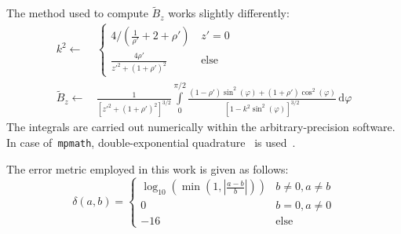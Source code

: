 The method used to compute $\tilde{B}_z$ works slightly differently:
\begin{align}
 k^2 \leftarrow&\,
  \begin{cases}
    4 / \left( \frac{1}{\rho'} + 2 + \rho' \right) &\, z' = 0 \\
    \frac{4 \rho'}{{z'}^2 + \left(1 + \rho'\right)^2} &\, \textrm{else}
  \end{cases} \nonumber \\
 \tilde{B}_z \leftarrow&\,
   \frac{1}{\left[ {z'}^2 + \left(1 + \rho'\right)^2 \right]^{3/2} }
                                 \int\limits_0^{\pi/2}
                                   \frac{(1-\rho') \sin^2(\varphi) + (1+\rho') \cos^2(\varphi)}
                                        {\left[1 - k^2 \sin^2(\varphi) \right]^{3/2}} \,\mathrm{d}\varphi
\end{align}
The integrals are carried out numerically within the arbitrary-precision software.
In case of~\texttt{mpmath}, double-exponential quadrature~\cite{double_exp_quad} is used~\cite{mpmath_quad}.




The error metric employed in this work is given as follows:
\begin{equation}
 \delta(a, b)
 = \begin{cases}
    \log_{10} \left(\min\left(1, \left| \frac{a - b}{b} \right|\right) \right) & b \neq 0, a \neq b \\
    0                                                                          & b=0, a \neq 0 \\
    -16                                                                        & \textrm{else}
   \end{cases}
\end{equation}


